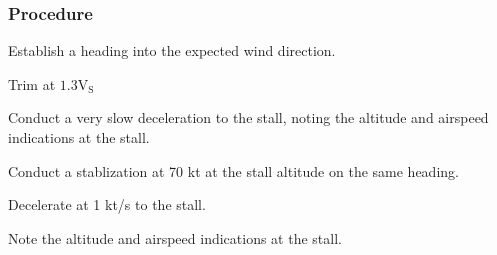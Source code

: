 % 
% 
%
 \subsubsection*{Procedure}
 \begin{compactenum}
   \item Establish a heading into the expected wind direction.
   \item Trim at $\mathrm{1.3V_{S}}$
   \item Conduct a very slow deceleration to the stall, noting the altitude and airspeed indications at the stall.
   \item Conduct a stablization at 70 kt at the stall altitude on the same heading.
   \item Decelerate at 1 kt/s to the stall.
   \item Note the altitude and airspeed indications at the stall.
   \end{compactenum}